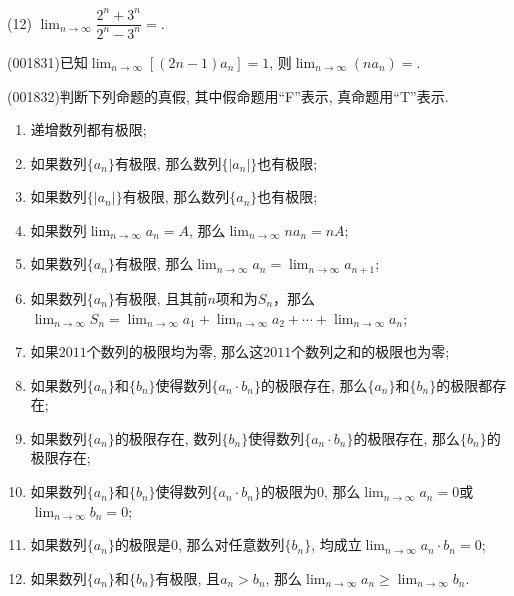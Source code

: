 (12) $\displaystyle\lim_{n\rightarrow \infty} \dfrac{2^n+3^n}{2^n-3^n}=$.
\item (001831)已知$\displaystyle\lim_{n\rightarrow \infty} [(2n-1)a_n]=1$, 则$\displaystyle\lim_{n\rightarrow \infty} (na_n)=$.
\item (001832)判断下列命题的真假, 其中假命题用``F''表示, 真命题用``T''表示.\\ 
\begin{enumerate}[\blank{20}(1)]
\item 递增数列都有极限;\\ 
\item 如果数列$\{a_n\}$有极限, 那么数列$\{|a_n|\}$也有极限;\\ 
\item 如果数列$\{|a_n|\}$有极限, 那么数列$\{a_n\}$也有极限;\\ 
\item 如果数列$\displaystyle\lim_{n\rightarrow \infty} a_n=A$, 那么$\displaystyle\lim_{n\rightarrow \infty} na_n=nA$;\\ 
\item 如果数列$\{a_n\}$有极限, 那么$\displaystyle\lim_{n\rightarrow \infty} a_n=\displaystyle\lim_{n\rightarrow \infty} a_{n+1}$;\\ 
\item 如果数列$\{a_n\}$有极限, 且其前$n$项和为$S_n$，那么$\displaystyle\lim_{n\rightarrow \infty} S_n=\displaystyle\lim_{n\rightarrow \infty} a_{1}+\displaystyle\lim_{n\rightarrow \infty} a_{2}+\cdots+\displaystyle\lim_{n\rightarrow \infty} a_{n}$;\\ 
\item 如果$2011$个数列的极限均为零, 那么这$2011$个数列之和的极限也为零;\\ 
\item 如果数列$\{a_n\}$和$\{b_n\}$使得数列$\{a_n\cdot b_n\}$的极限存在, 那么$\{a_n\}$和$\{b_n\}$的极限都存在;\\ 
\item 如果数列$\{a_n\}$的极限存在, 数列$\{b_n\}$使得数列$\{a_n\cdot b_n\}$的极限存在, 那么$\{b_n\}$的极限存在;\\ 
\item 如果数列$\{a_n\}$和$\{b_n\}$使得数列$\{a_n\cdot b_n\}$的极限为$0$, 那么$\displaystyle\lim_{n\rightarrow \infty} a_n=0$或$\displaystyle\lim_{n\rightarrow \infty} b_n=0$;\\ 
\item 如果数列$\{a_n\}$的极限是$0$, 那么对任意数列$\{b_n\}$, 均成立$\displaystyle\lim_{n\rightarrow \infty} a_n\cdot b_n=0$;\\ 
\item 如果数列$\{a_n\}$和$\{b_n\}$有极限, 且$a_n>b_n$, 那么$\displaystyle\lim_{n\rightarrow \infty} a_n\geq\displaystyle\lim_{n\rightarrow \infty} b_n$.
\end{enumerate}
